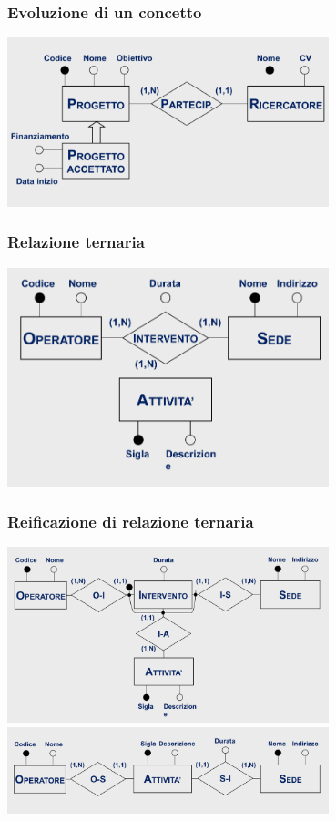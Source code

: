 \subsubsection{Evoluzione di un concetto}

\begin{center}
    \includegraphics[width=0.7\textwidth]{img/evoluzioneDiConcetto.png}
\end{center}

\subsubsection{Relazione ternaria}

\begin{center}
    \includegraphics[width=0.7\textwidth]{img/relazioneTernaria.png}
\end{center}

\subsubsection{Reificazione di relazione ternaria}
\begin{center}
    \includegraphics[width=0.7\textwidth]{img/reificazioneDiRelazioneTernaria.png}
    \includegraphics[width=0.7\textwidth]{img/reificazioneDiRelazioneTernaria2.png}
\end{center}

